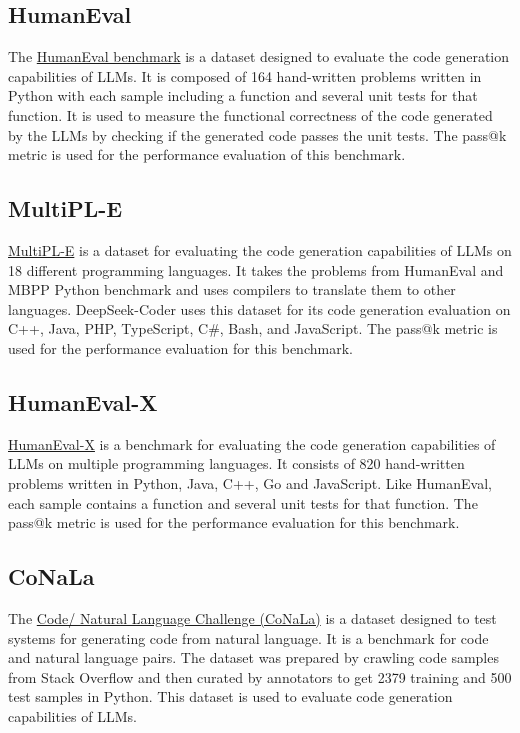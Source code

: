 \subsection{HumanEval} \label{humaneval}
The \href{https://huggingface.co/datasets/openai/openai_humaneval}{HumanEval benchmark} \cite{chen2021evaluating} is a dataset designed to evaluate the code generation capabilities of LLMs. It is composed of 164 hand-written problems written in Python with each sample including a function and several unit tests for that function. It is used to measure the functional correctness of the code generated by the LLMs by checking if the generated code passes the unit tests. The pass@k metric is used for the performance evaluation of this benchmark.

\subsection{MultiPL-E} \label{multiple}
\href{https://huggingface.co/datasets/nuprl/MultiPL-E}{MultiPL-E} is a dataset for evaluating the code generation capabilities of LLMs on 18 different programming languages. It takes the problems from HumanEval and MBPP Python benchmark and uses compilers to translate them to other languages. DeepSeek-Coder uses this dataset for its code generation evaluation on C++, Java, PHP, TypeScript, C\#, Bash, and JavaScript. The pass@k metric is used for the performance evaluation for this benchmark.

\subsection{HumanEval-X} 
\href{https://huggingface.co/datasets/THUDM/humaneval-x}{HumanEval-X} is a benchmark for evaluating the code generation capabilities of LLMs on multiple programming languages. It consists of 820 hand-written problems written in Python, Java, C++, Go and JavaScript. Like HumanEval, each sample contains a function and several unit tests for that function. The pass@k metric is used for the performance evaluation for this benchmark.

\subsection{CoNaLa} \label{conala}
The \href{https://huggingface.co/datasets/neulab/conala}{Code/ Natural Language Challenge (CoNaLa)} is a dataset designed to test systems for generating code from natural language. It is a benchmark for code and natural language pairs. The dataset was prepared by crawling code samples from Stack Overflow and then curated by annotators to get 2379 training and 500 test samples in Python. This dataset is used to evaluate code generation capabilities of LLMs.

